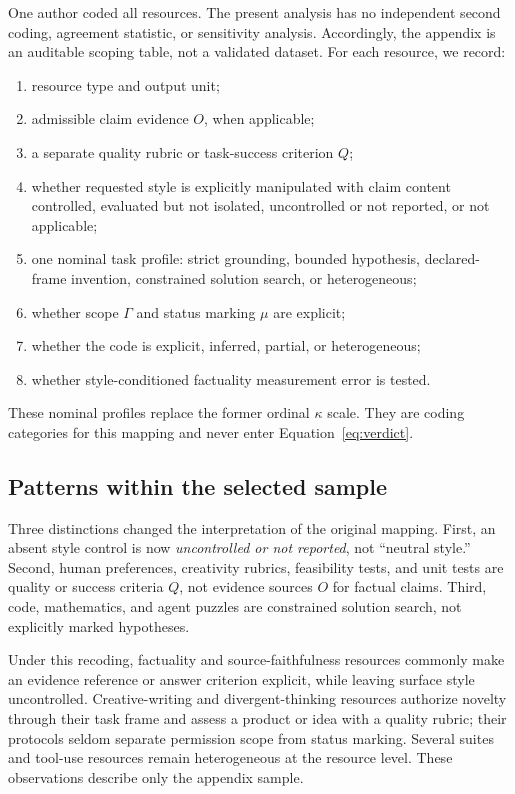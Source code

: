 \documentclass{clv2025}
\begin{document}
One author coded all resources.
The present analysis has no independent second coding, agreement
statistic, or sensitivity analysis.
Accordingly, the appendix is an auditable scoping table, not a validated
dataset.
For each resource, we record:
\begin{enumerate}
  \item resource type and output unit;
  \item admissible claim evidence $O$, when applicable;
  \item a separate quality rubric or task-success criterion $Q$;
  \item whether requested style is explicitly manipulated with claim
  content controlled, evaluated but not isolated, uncontrolled or not
  reported, or not applicable;
  \item one nominal task profile: strict grounding, bounded hypothesis,
  declared-frame invention, constrained solution search, or heterogeneous;
  \item whether scope $\Gamma$ and status marking $\mu$ are explicit;
  \item whether the code is explicit, inferred, partial, or heterogeneous;
  \item whether style-conditioned factuality measurement error is tested.
\end{enumerate}
These nominal profiles replace the former ordinal $\kappa$ scale.
They are coding categories for this mapping and never enter
Equation~\ref{eq:verdict}.

\subsection{Patterns within the selected sample}

Three distinctions changed the interpretation of the original mapping.
First, an absent style control is now \emph{uncontrolled or not reported},
not ``neutral style.''
Second, human preferences, creativity rubrics, feasibility tests, and unit
tests are quality or success criteria $Q$, not evidence sources $O$ for
factual claims.
Third, code, mathematics, and agent puzzles are constrained solution
search, not explicitly marked hypotheses.

Under this recoding, factuality and source-faithfulness resources commonly
make an evidence reference or answer criterion explicit, while leaving
surface style uncontrolled.
Creative-writing and divergent-thinking resources authorize novelty
through their task frame and assess a product or idea with a quality
rubric; their protocols seldom separate permission scope from status
marking.
Several suites and tool-use resources remain heterogeneous at the
resource level.
These observations describe only the appendix sample.
\end{document}
